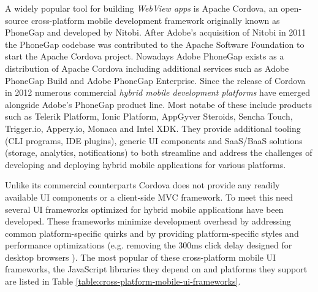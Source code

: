 \documentclass[thesis.tex]{subfiles}
\begin{document}
A widely popular tool for building \textit{WebView apps} is Apache Cordova, an open-source cross-platform mobile development framework originally known as PhoneGap and developed by Nitobi. After Adobe's acquisition of Nitobi in 2011 the PhoneGap codebase was contributed to the Apache Software Foundation to start the Apache Cordova project. Nowadays Adobe PhoneGap exists as a distribution of Apache Cordova including additional services such as Adobe PhoneGap Build and Adobe PhoneGap Enterprise. Since the release of Cordova in 2012 numerous commercial \textit{hybrid mobile development platforms} have emerged alongside Adobe's PhoneGap product line. Most notabe of these include products such as Telerik Platform, Ionic Platform, AppGyver Steroids, Sencha Touch, Trigger.io, Appery.io, Monaca and Intel XDK. They provide additional tooling (CLI programs, IDE plugins), generic UI components and SaaS/BaaS solutions (storage, analytics, notifications) to both streamline and address the challenges of developing and deploying hybrid mobile applications for various platforms.

Unlike its commercial counterparts Cordova does not provide any readily available UI components or a client-side MVC framework. To meet this need several UI frameworks optimized for hybrid mobile applications have been developed. These frameworks minimize development overhead by addressing common platform-specific quirks and by providing platform-specific styles and performance optimizations (e.g. removing the 300ms click delay designed for desktop browsers \cite{click_delay}). The most popular of these cross-platform mobile UI frameworks, the JavaScript libraries they depend on and platforms they support are listed in Table \ref{table:cross-platform-mobile-ui-frameworks}.
\end{document}
